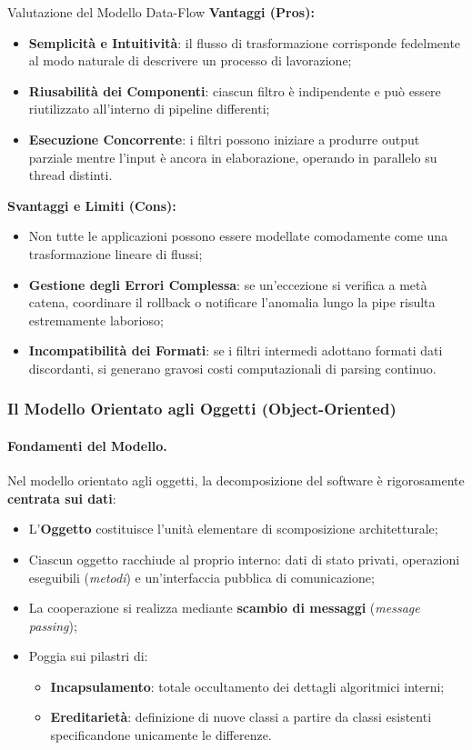 \documentclass[12pt]{extarticle}
\begin{document}
\begin{cbox}{Valutazione del Modello Data-Flow}
\noindent \textbf{Vantaggi (Pros):}
\begin{itemize}
    \item \textbf{Semplicità e Intuitività}: il flusso di trasformazione corrisponde fedelmente al modo naturale di descrivere un processo di lavorazione;
    \item \textbf{Riusabilità dei Componenti}: ciascun filtro è indipendente e può essere riutilizzato all'interno di pipeline differenti;
    \item \textbf{Esecuzione Concorrente}: i filtri possono iniziare a produrre output parziale mentre l'input è ancora in elaborazione, operando in parallelo su thread distinti.
\end{itemize}
\medskip
\noindent \textbf{Svantaggi e Limiti (Cons):}
\begin{itemize}
    \item Non tutte le applicazioni possono essere modellate comodamente come una trasformazione lineare di flussi;
    \item \textbf{Gestione degli Errori Complessa}: se un'eccezione si verifica a metà catena, coordinare il rollback o notificare l'anomalia lungo la pipe risulta estremamente laborioso;
    \item \textbf{Incompatibilità dei Formati}: se i filtri intermedi adottano formati dati discordanti, si generano gravosi costi computazionali di parsing continuo.
\end{itemize}
\end{cbox}

\subsubsection{Il Modello Orientato agli Oggetti (Object-Oriented)}

\paragraph{Fondamenti del Modello.}
Nel modello orientato agli oggetti, la decomposizione del software è rigorosamente \textbf{centrata sui dati}:
\begin{itemize}
    \item L'\textbf{Oggetto} costituisce l'unità elementare di scomposizione architetturale;
    \item Ciascun oggetto racchiude al proprio interno: dati di stato privati, operazioni eseguibili (\textit{metodi}) e un'interfaccia pubblica di comunicazione;
    \item La cooperazione si realizza mediante \textbf{scambio di messaggi} (\textit{message passing});
    \item Poggia sui pilastri di:
    \begin{itemize}
        \item \textbf{Incapsulamento}: totale occultamento dei dettagli algoritmici interni;
        \item \textbf{Ereditarietà}: definizione di nuove classi a partire da classi esistenti specificandone unicamente le differenze.
    \end{itemize}
\end{itemize}
\end{document}
